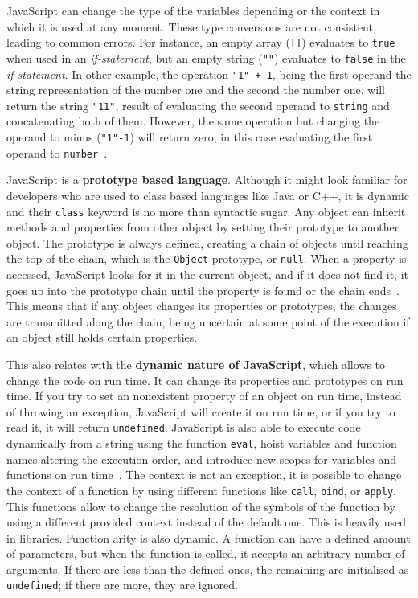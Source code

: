 \documentclass{uvamscse}
\begin{document}
JavaScript can change the type of the variables depending or the context in which it is used at any moment. These type conversions are not consistent, leading to common errors. For instance, an empty array (\texttt{[]}) evaluates to \texttt{true} when used in an \textit{if-statement}, but an empty string (\texttt{""}) evaluates to \texttt{false} in the \textit{if-statement}. In other example, the operation \texttt{"1" + 1}, being the first operand the string representation of the number one and the second the number one, will return the string \texttt{"11"}, result of evaluating the second operand to \texttt{string} and concatenating both of them. However, the same operation but changing the operand to minus (\texttt{"1"-1}) will return zero, in this  case evaluating the first operand to \texttt{number}~\cite{FlanaganDavid2011J:td}.

JavaScript is a \textbf{prototype based language}. Although it might look familiar for developers who are used to class based languages like Java or C++, it is dynamic and their \texttt{class} keyword is no more than syntactic sugar. Any object can inherit methods and properties from other object by setting their prototype to another object. The prototype is always defined, creating a chain of objects until reaching the top of the chain, which is the \texttt{Object} prototype, or \texttt{null}. When a property is accessed, JavaScript looks for it in the current object, and if it does not find it, it goes up into the prototype chain until the property is found or the chain ends~\cite{MDNProtoType}. This means that if any object changes its properties or prototypes, the changes are transmitted along the chain, being uncertain at some point of the execution if an object still holds certain properties.

This also relates with the \textbf{dynamic nature of JavaScript}, which allows to change the code on run time. It can change its properties and prototypes on run time. If you try to set an nonexistent property of an object on run time, instead of throwing an exception, JavaScript will create it on run time, or if you try to read it, it will return \texttt{undefined}. JavaScript is also able to execute code dynamically from a string using the function \texttt{eval}, hoist variables and function names altering the execution order, and introduce new scopes for variables and functions on run time~\cite{SunKwangwon2017AoJP}. The context is not an exception, it is possible to change the context of a function by using different functions like \texttt{call}, \texttt{bind}, or \texttt{apply}. This functions allow to change the resolution of the symbols of the function by using a different provided context instead of the default one. This is heavily used in libraries. Function arity is also dynamic. A function can have a defined amount of parameters, but when the function is called, it accepts an arbitrary number of arguments. If there are less than the defined ones, the remaining are initialised as \texttt{undefined}; if there are more, they are ignored.
\end{document}
